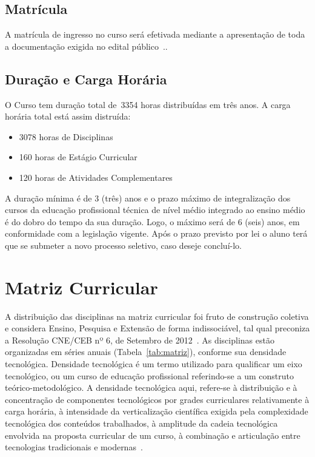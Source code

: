 \documentclass[11pt,fleqn]{book} %
\newcommand{\VER}[1]{\begingroup\color{red}#1\endgroup}
\begin{document}
\subsection{Matrícula}

A matrícula de ingresso no curso será efetivada mediante a apresentação de toda a documentação exigida no edital público~\cite{Resolucao22De2011}..

\subsection{Duração e Carga Horária}
\indent

O Curso tem duração total de~\VER{3354} horas distribuídas em três anos.
A carga horária total está assim distruída:
\begin{itemize}
	\item \VER{3078} horas de Disciplinas
	\item \VER{160} horas de Estágio Curricular
	\item \VER{120} horas de Atividades Complementares
\end{itemize}

A duração mínima é de 3 (três) anos e o prazo máximo de integralização dos cursos da educação profissional técnica de nível médio integrado ao ensino médio é do dobro do tempo da sua duração. 
Logo, o máximo será de 6 (seis) anos, em conformidade com a legislação vigente. 
Após o prazo previsto por lei o aluno terá que se submeter a novo processo seletivo, caso deseje concluí-lo.


\section{Matriz Curricular}\label{matriz}
\indent
%
%

A distribuição das disciplinas na matriz curricular foi fruto de construção coletiva e considera Ensino, Pesquisa e Extensão de forma indissociável, tal qual preconiza  a Resolução CNE/CEB nº 6, de Setembro de 2012~\cite{Resolucao06De2012}.
As disciplinas estão organizadas em séries anuais (Tabela~\ref{tab:matriz}), conforme sua densidade tecnológica.
Densidade tecnológica é um termo utilizado para qualificar um eixo tecnológico, ou um curso de educação profissional referindo-se a um construto teórico-metodológico. 
A densidade tecnológica aqui, refere-se à distribuição e à concentração de componentes tecnológicos por grades curriculares relativamente à carga horária, à intensidade da verticalização científica exigida pela complexidade tecnológica dos conteúdos trabalhados, à amplitude da cadeia tecnológica envolvida na proposta curricular de um curso, à combinação e articulação entre tecnologias tradicionais e modernas~\cite{Machado2010}.
\end{document}
